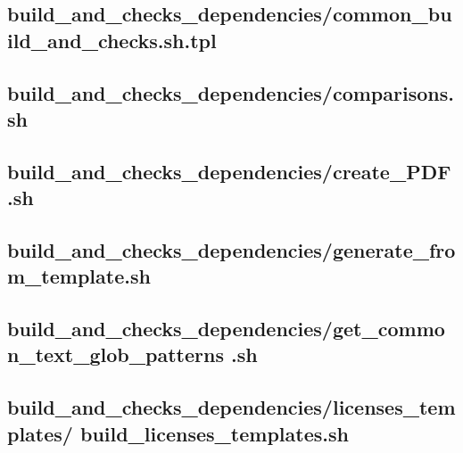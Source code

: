 \documentclass{article}
\begin{document}


\subsection{
  build\_and\_checks\_dependencies/common\_build\_and\_checks.sh.tpl
}
\label{
  build_and_checks_dependencies:common_build_and_checksshtpl
}



\subsection{
  build\_and\_checks\_dependencies/comparisons.sh
}
\label{
  build_and_checks_dependencies:comparisonssh
}



\subsection{
  build\_and\_checks\_dependencies/create\_PDF.sh
}
\label{
  build_and_checks_dependencies:create_PDFsh
}



\subsection{
  build\_and\_checks\_dependencies/generate\_from\_template.sh
}
\label{
  build_and_checks_dependencies:generate_from_templatesh
}



\subsection{
  build\_and\_checks\_dependencies/get\_common\_text\_glob\_patterns%
.sh
}
\label{
  build_and_checks_dependencies:get_common_text_glob_patternssh
}



\subsection{
  build\_and\_checks\_dependencies/licenses\_templates/%
build\_licenses\_templates.sh
}
\label{
  build_and_checks_dependencies:licenses_templates:%
build_licenses_templatessh
}
\end{document}
